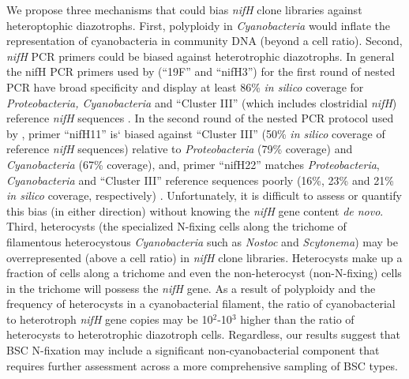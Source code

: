 We propose three mechanisms that could bias
\textit{nifH} clone libraries against heteroptophic diazotrophs. First,
polyploidy in \textit{Cyanobacteria} \citep{Griese_2011} would inflate 
the representation of cyanobacteria in community DNA (beyond a cell ratio). 
Second, \textit{nifH} PCR primers could be biased against
heterotrophic diazotrophs. In general the nifH PCR primers used by
\citet{Yeager,14766579,Yeager_2012} (``19F'' and ``nifH3'') for the first round
of nested PCR have broad specificity and display at least 86\% \textit{in
silico} coverage for \textit{Proteobacteria, Cyanobacteria} and ``Cluster III''
(which includes clostridial \textit{nifH}) reference \textit{nifH} sequences
\citep{Gaby_2012}. In the second round of the nested PCR protocol
used by \citet{Yeager,14766579,Yeager_2012}, primer ``nifH11'' is` biased against
``Cluster III'' (50\% \textit{in silico} coverage of reference \textit{nifH}
sequences) relative to \textit{Proteobacteria} (79\% coverage) and
\textit{Cyanobacteria} (67\% coverage), and, primer ``nifH22'' matches
\textit{Proteobacteria}, \textit{Cyanobacteria} and ``Cluster III'' reference
sequences poorly (16\%, 23\% and 21\% \textit{in silico} coverage,
respectively) \citep{Gaby_2012}.  Unfortunately, it is difficult to assess or
quantify this bias (in either direction) without knowing the \textit{nifH} gene
content \textit{de novo}. Third, heterocysts (the specialized N-fixing cells
along the trichome of filamentous heterocystous \textit{Cyanobacteria} such as
\textit{Nostoc} and \textit{Scytonema}) may be overrepresented (above a cell
ratio) in \textit{nifH} clone libraries. Heterocysts make up a fraction of
cells along a trichome and even the non-heterocyst (non-N-fixing) cells in the
trichome will possess the \textit{nifH} gene. As a result of polyploidy and the
frequency of heterocysts in a cyanobacterial filament, the ratio of
cyanobacterial to heterotroph \textit{nifH} gene copies may be 
10$^{2}$-10$^{3}$ higher than the ratio of heterocysts to heterotrophic
diazotroph cells. Regardless, our results suggest that BSC N-fixation may
include a significant non-cyanobacterial component that requires further
assessment across a more comprehensive sampling of BSC types.

